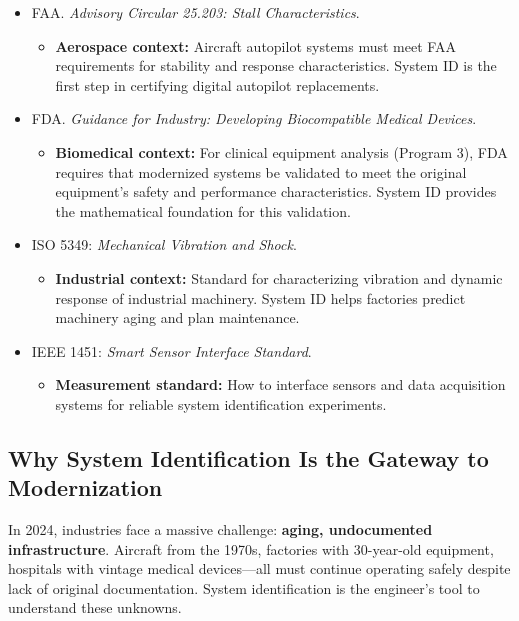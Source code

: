 \documentclass[11pt,letterpaper]{article}
\begin{document}
\begin{itemize}
    \item FAA. \textit{Advisory Circular 25.203: Stall Characteristics}.
    \begin{itemize}
        \item \textbf{Aerospace context:} Aircraft autopilot systems must meet FAA requirements for stability and response characteristics. System ID is the first step in certifying digital autopilot replacements.
    \end{itemize}

    \item FDA. \textit{Guidance for Industry: Developing Biocompatible Medical Devices}.
    \begin{itemize}
        \item \textbf{Biomedical context:} For clinical equipment analysis (Program 3), FDA requires that modernized systems be validated to meet the original equipment's safety and performance characteristics. System ID provides the mathematical foundation for this validation.
    \end{itemize}

    \item ISO 5349: \textit{Mechanical Vibration and Shock}.
    \begin{itemize}
        \item \textbf{Industrial context:} Standard for characterizing vibration and dynamic response of industrial machinery. System ID helps factories predict machinery aging and plan maintenance.
    \end{itemize}

    \item IEEE 1451: \textit{Smart Sensor Interface Standard}.
    \begin{itemize}
        \item \textbf{Measurement standard:} How to interface sensors and data acquisition systems for reliable system identification experiments.
    \end{itemize}
\end{itemize}

\subsection*{Why System Identification Is the Gateway to Modernization}

In 2024, industries face a massive challenge: \textbf{aging, undocumented infrastructure}. Aircraft from the 1970s, factories with 30-year-old equipment, hospitals with vintage medical devices—all must continue operating safely despite lack of original documentation. System identification is the engineer's tool to understand these unknowns.
\end{document}
